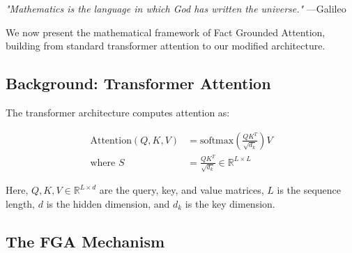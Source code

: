 \documentclass[11pt, a4paper]{article}
\theoremstyle{definition}
\newcommand{\R}{\mathbb{R}}
\newcommand{\softmax}{\text{softmax}}
\begin{document}
\textit{"Mathematics is the language in which God has written the universe."} —Galileo

We now present the mathematical framework of Fact Grounded Attention, building from standard transformer attention to our modified architecture.

\subsection{Background: Transformer Attention}

The transformer architecture \cite{vaswani2017attention} computes attention as:

\begin{align}
\text{Attention}(Q, K, V) &= \softmax\left(\frac{QK^T}{\sqrt{d_k}}\right)V \\
\text{where } S &= \frac{QK^T}{\sqrt{d_k}} \in \R^{L \times L}
\end{align}

Here, $Q, K, V \in \R^{L \times d}$ are the query, key, and value matrices, $L$ is the sequence length, $d$ is the hidden dimension, and $d_k$ is the key dimension.

\subsection{The FGA Mechanism}
\end{document}
